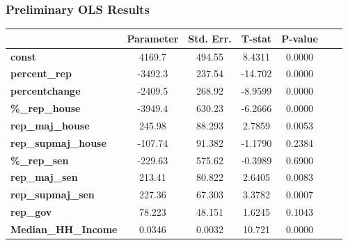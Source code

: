 \documentclass{beamer}
\begin{document}
\begin{frame}
\frametitle{Preliminary OLS Results}

\begin{center}

\begin{tabular}{lcccccc}
                                                                      & \textbf{Parameter} & \textbf{Std. Err.} & \textbf{T-stat} & \textbf{P-value} \\
\midrule
\textbf{const}                                                        &       4169.7       &       494.55       &      8.4311     &      0.0000     \\
\textbf{percent\_rep}                                                 &      -3492.3       &       237.54       &     -14.702     &      0.0000      \\
\textbf{percentchange}                                                &      -2409.5       &       268.92       &     -8.9599     &      0.0000     \\
\textbf{\%\_rep\_house}                                               &      -3949.4       &       630.23       &     -6.2666     &      0.0000      \\
\textbf{rep\_maj\_house}                                              &       245.98       &       88.293       &      2.7859     &      0.0053      \\
\textbf{rep\_supmaj\_house}                                           &      -107.74       &       91.382       &     -1.1790     &      0.2384      \\
\textbf{\%\_rep\_sen}                                                 &      -229.63       &       575.62       &     -0.3989     &      0.6900      \\
\textbf{rep\_maj\_sen}                                                &       213.41       &       80.822       &      2.6405     &      0.0083      \\
\textbf{rep\_supmaj\_sen}                                             &       227.36       &       67.303       &      3.3782     &      0.0007      \\
\textbf{rep\_gov}                                                     &       78.223       &       48.151       &      1.6245     &      0.1043      \\
\textbf{Median\_HH\_Income}                                           &       0.0346       &       0.0032       &      10.721     &      0.0000      \\

\end{tabular}
\end{center}
\end{frame}
\end{document}
